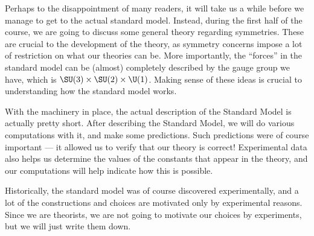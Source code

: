 \documentclass[a4paper]{article}
\begin{document}
Perhaps to the disappointment of many readers, it will take us a while before we manage to get to the actual standard model. Instead, during the first half of the course, we are going to discuss some general theory regarding symmetries. These are crucial to the development of the theory, as symmetry concerns impose a lot of restriction on what our theories can be. More importantly, the ``forces'' in the standard model can be (almost) completely described by the gauge group we have, which is $\SU(3) \times \SU(2) \times \U(1)$. Making sense of these ideas is crucial to understanding how the standard model works.

With the machinery in place, the actual description of the Standard Model is actually pretty short. After describing the Standard Model, we will do various computations with it, and make some predictions. Such predictions were of course important --- it allowed us to verify that our theory is correct! Experimental data also helps us determine the values of the constants that appear in the theory, and our computations will help indicate how this is possible.

Historically, the standard model was of course discovered experimentally, and a lot of the constructions and choices are motivated only by experimental reasons. Since we are theorists, we are not going to motivate our choices by experiments, but we will just write them down.
\end{document}
